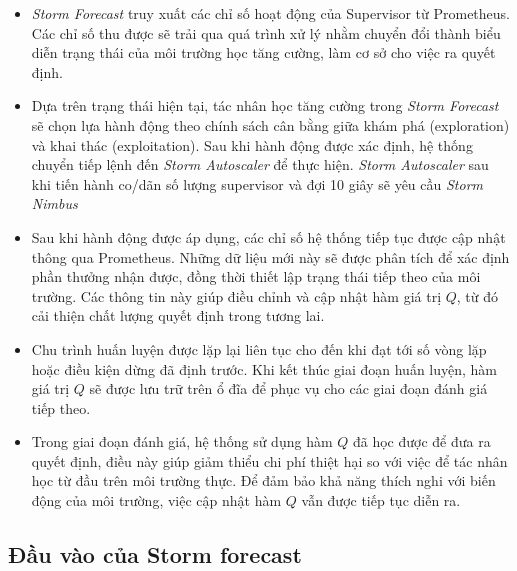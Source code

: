 \begin{itemize}
    \item \textit{Storm Forecast} truy xuất các chỉ số hoạt động của Supervisor từ Prometheus. Các chỉ số thu được sẽ trải qua quá trình xử lý nhằm chuyển đổi thành biểu diễn trạng thái của môi trường học tăng cường, làm cơ sở cho việc ra quyết định.

    \item Dựa trên trạng thái hiện tại, tác nhân học tăng cường trong \textit{Storm Forecast} sẽ chọn lựa hành động theo chính sách cân bằng giữa khám phá (exploration) và khai thác (exploitation). Sau khi hành động được xác định, hệ thống chuyển tiếp lệnh đến \textit{Storm Autoscaler} để thực hiện. \textit{Storm Autoscaler} sau khi tiến hành co/dãn số lượng supervisor và đợi 10 giây sẽ yêu cầu \textit{Storm Nimbus}

    \item Sau khi hành động được áp dụng, các chỉ số hệ thống tiếp tục được cập nhật thông qua Prometheus. Những dữ liệu mới này sẽ được phân tích để xác định phần thưởng nhận được, đồng thời thiết lập trạng thái tiếp theo của môi trường. Các thông tin này giúp điều chỉnh và cập nhật hàm giá trị \( Q \), từ đó cải thiện chất lượng quyết định trong tương lai.

    \item Chu trình huấn luyện được lặp lại liên tục cho đến khi đạt tới số vòng lặp hoặc điều kiện dừng đã định trước. Khi kết thúc giai đoạn huấn luyện, hàm giá trị \( Q \) sẽ được lưu trữ trên ổ đĩa để phục vụ cho các giai đoạn đánh giá tiếp theo.

    \item Trong giai đoạn đánh giá, hệ thống sử dụng hàm \( Q \) đã học được để đưa ra quyết định, điều này giúp giảm thiểu chi phí thiệt hại so với việc để tác nhân học từ đầu trên môi trường thực. Để đảm bảo khả năng thích nghi với biến động của môi trường, việc cập nhật hàm \( Q \) vẫn được tiếp tục diễn ra.

\end{itemize}

\subsection{Đầu vào của Storm forecast}

